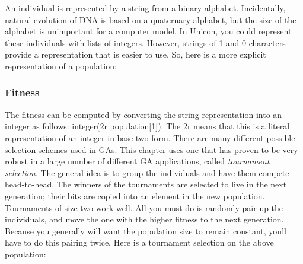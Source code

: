 An individual is represented by a string from a binary alphabet.
Incidentally, natural evolution of DNA is based on a quaternary
alphabet, but the size of the alphabet is unimportant for a computer
model. In Unicon, you could represent these individuals with lists of
integers. However, strings of \textsf{{\textquotedbl}1{\textquotedbl}}
and \textsf{{\textquotedbl}0{\textquotedbl}} characters provide a
representation that is easier to use. So, here is a more explicit
representation of a population:


\subsubsection{Fitness}

The fitness can be computed by converting the string representation into
an integer as follows: \textsf{integer({\textquotedbl}2r{\textquotedbl}
{\textbar}{\textbar} population[1])}. The \textsf{2r} means that this
is a literal representation of an integer in base two form. There are
many different possible selection schemes used in GAs. This chapter
uses one that has proven to be very robust in a large number of
different GA applications, called \textit{tournament selection}. The
general idea is to group the individuals and have them compete
head-to-head. The winners of the tournaments are selected to live in
the next generation; their bits are copied into an element in the new
population. Tournaments of size two work well. All you must do is
randomly pair up the individuals, and move the one with the higher
fitness to the next generation. Because you generally will want the
population size to remain constant, you{\textquotesingle}ll have to do
this pairing twice. Here is a tournament selection on the above
population:


